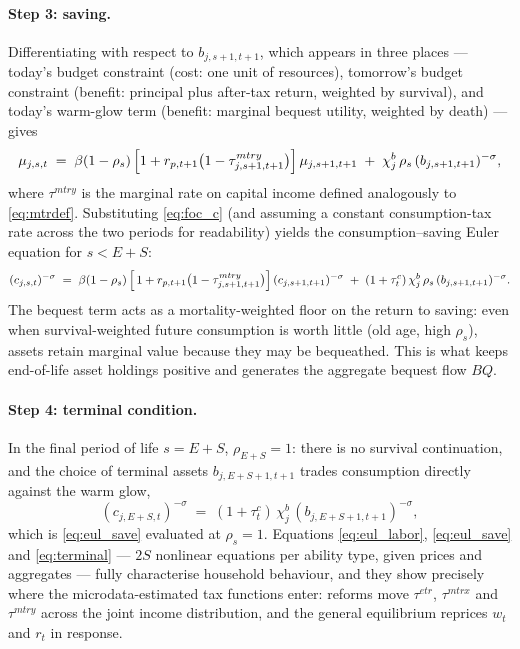 \paragraph{Step 3: saving.} Differentiating with respect to $b_{j,s+1,t+1}$, which appears in three places --- today's budget constraint (cost: one unit of resources), tomorrow's budget constraint (benefit: principal plus after-tax return, weighted by survival), and today's warm-glow term (benefit: marginal bequest utility, weighted by death) --- gives
\begin{equation}
\label{eq:eul_save_raw}
\mu_{j,s,t} \;=\; \beta(1-\rho_s)\,
\Bigl[1 + r_{p,t+1}\bigl(1-\tau^{mtry}_{j,s+1,t+1}\bigr)\Bigr]\,\mu_{j,s+1,t+1}
\;+\; \chi^b_j\,\rho_s\,(b_{j,s+1,t+1})^{-\sigma},
\end{equation}
where $\tau^{mtry}$ is the marginal rate on capital income defined analogously to \eqref{eq:mtrdef}. Substituting \eqref{eq:foc_c} (and assuming a constant consumption-tax rate across the two periods for readability) yields the consumption--saving Euler equation for $s<E+S$:
\begin{equation}
\label{eq:eul_save}
(c_{j,s,t})^{-\sigma} \;=\; \beta(1-\rho_s)\,
\Bigl[\,1 + r_{p,t+1}\bigl(1-\tau^{mtry}_{j,s+1,t+1}\bigr)\Bigr]\,(c_{j,s+1,t+1})^{-\sigma}
\;+\; (1+\tau^c_t)\,\chi^b_j\,\rho_s\,(b_{j,s+1,t+1})^{-\sigma}.
\end{equation}
The bequest term acts as a mortality-weighted floor on the return to saving: even when survival-weighted future consumption is worth little (old age, high $\rho_s$), assets retain marginal value because they may be bequeathed. This is what keeps end-of-life asset holdings positive and generates the aggregate bequest flow $BQ$.

\paragraph{Step 4: terminal condition.} In the final period of life $s=E+S$, $\rho_{E+S}=1$: there is no survival continuation, and the choice of terminal assets $b_{j,E+S+1,t+1}$ trades consumption directly against the warm glow,
\begin{equation}
\label{eq:terminal}
(c_{j,E+S,t})^{-\sigma} \;=\; (1+\tau^c_t)\,\chi^b_j\,(b_{j,E+S+1,t+1})^{-\sigma},
\end{equation}
which is \eqref{eq:eul_save} evaluated at $\rho_s=1$. Equations \eqref{eq:eul_labor}, \eqref{eq:eul_save} and \eqref{eq:terminal} --- $2S$ nonlinear equations per ability type, given prices and aggregates --- fully characterise household behaviour, and they show precisely where the microdata-estimated tax functions enter: reforms move $\tau^{etr}$, $\tau^{mtrx}$ and $\tau^{mtry}$ across the joint income distribution, and the general equilibrium reprices $w_t$ and $r_t$ in response.

